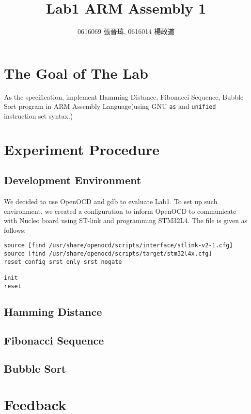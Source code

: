 \title{Lab1 ARM Assembly 1}
\author{0616069 張晉瑋, 0616014 楊政道}
\maketitle
\thispagestyle{fancy}
\section{The Goal of The Lab}
\paragraph{}
As the specification, implement Hamming Distance, Fibonacci Sequence, Bubble Sort program in ARM Assembly Language(using GNU \texttt{as} and \texttt{unified} instruction set syntax.)
\section{Experiment Procedure}
\subsection{Development Environment}
\paragraph{}
We decided to use OpenOCD and gdb to evaluate Lab1.
To set up such environment, we created a configuration to inform OpenOCD to communicate with Nucleo board using ST-link and programming STM32L4.
The file is given as follows:
\begin{lstlisting}
source [find /usr/share/openocd/scripts/interface/stlink-v2-1.cfg]
source [find /usr/share/openocd/scripts/target/stm32l4x.cfg]
reset_config srst_only srst_nogate

init
reset
\end{lstlisting}
\subsection{Hamming Distance}
\paragraph{}
\subsection{Fibonacci Sequence}
\paragraph{}
\subsection{Bubble Sort}
\paragraph{}
\section{Feedback}
\paragraph{}
